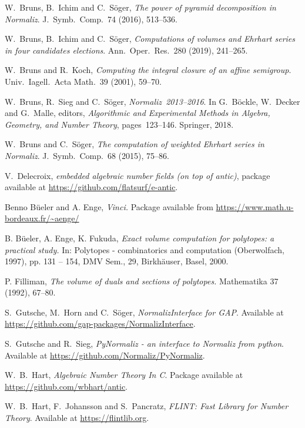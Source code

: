 \documentclass[12pt,a4paper]{scrartcl}
\theoremstyle{definition}
\begin{document}
\begin{thebibliography}{15.}
W.~Bruns, B.~Ichim and C.~S\"oger,
\emph{The power of pyramid decomposition in Normaliz}.
J.\ Symb.\ Comp.\ 74 (2016), 513--536.

W.~Bruns, B.~Ichim and C.~S\"oger,
\emph{Computations of volumes and Ehrhart series in four candidates elections}.
Ann.\ Oper.\ Res.\ 280 (2019), 241--265.

W.~Bruns and R.~Koch,
\emph{Computing the integral closure of an affine semigroup}.
Univ.\ Iagell.\ Acta Math.\ 39 (2001), 59--70.

W.~Bruns, R.~Sieg and C.~S\"oger,
\emph{Normaliz~2013--2016}.
In
G.~B\"ockle, W.~Decker and G.~Malle, editors,
\emph{Algorithmic and Experimental Methods in Algebra, Geometry, and Number Theory},
pages~123--146.
Springer, 2018.

W.~Bruns and C.~S\"oger,
\emph{The computation of weighted Ehrhart series in Normaliz}.
J.\ Symb.\ Comp.\ 68 (2015), 75--86.

V.~Delecroix,
\emph{embedded algebraic number fields (on top of antic)},
package available at \url{https://github.com/flatsurf/e-antic}.

 Benno B\"{u}eler and A. Enge, \emph{Vinci.} Package available from \url{https://www.math.u-bordeaux.fr/~aenge/}

B. Büeler, A. Enge, K. Fukuda, \emph{Exact volume computation for polytopes: a practical study.} In: Polytopes - combinatorics and computation (Oberwolfach, 1997), pp. 131 -- 154,
DMV Sem., 29, Birkhäuser, Basel, 2000.

P. Filliman, \emph{The volume of duals and sections of polytopes. } Mathematika 37 (1992), 67--80.

S.~Gutsche, M.~Horn and C.~S\"oger,
\emph{NormalizInterface for GAP}.
Available at \url{https://github.com/gap-packages/NormalizInterface}.

S.~Gutsche and R.~Sieg,
\emph{PyNormaliz - an interface to Normaliz from python}.
Available at \url{https://github.com/Normaliz/PyNormaliz}.

W.~B.~Hart,
\emph{Algebraic Number Theory In C}.
Package available at \url{https://github.com/wbhart/antic}.

W.~B.~Hart, F.~Johansson and S.~Pancratz,
\emph{FLINT: Fast Library for Number Theory}.
Available at \url{https://flintlib.org}.


\end{thebibliography}
\end{document}
